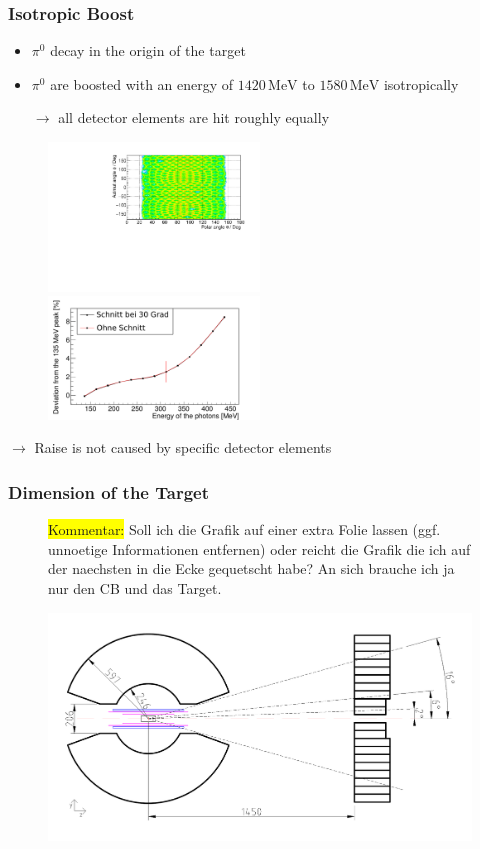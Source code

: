 \documentclass[slidestop,compress,mathserif]{beamer}
\begin{document}
\begin{frame}
	\frametitle{Isotropic Boost}
	\begin{itemize}
		\item $\pi^0$ decay in the origin of the target
		\item $\pi^0$ are boosted with an energy of $ 1420\, \text{MeV}$ to $1580\, \text{MeV}$ isotropically
		
		$\rightarrow$ all detector elements are hit roughly equally 
	\end{itemize}
	
	\begin{figure}
		\includegraphics[width=0.50\textwidth]{Pictures/20171204DistributionPhotonUrsprungIsotrop}
		\includegraphics[width=0.50\textwidth]{Pictures/20172804IsotropUrpsprungDeviation}
	
	\end{figure}
$\rightarrow$ Raise is not caused by specific detector elements
\end{frame}

\begin{frame}
	\frametitle{Dimension of the Target}
	\begin{figure}
		\colorbox{yellow}{Kommentar:} Soll ich die Grafik auf einer extra Folie lassen (ggf. unnoetige Informationen entfernen) oder reicht die Grafik die ich auf der naechsten in die Ecke gequetscht habe? An sich brauche ich ja nur den CB und das Target.
		
	\includegraphics[width=1.00\textwidth]{Pictures/cbtaps_side.pdf}
	\end{figure}
	
	
\end{frame}
\end{document}
